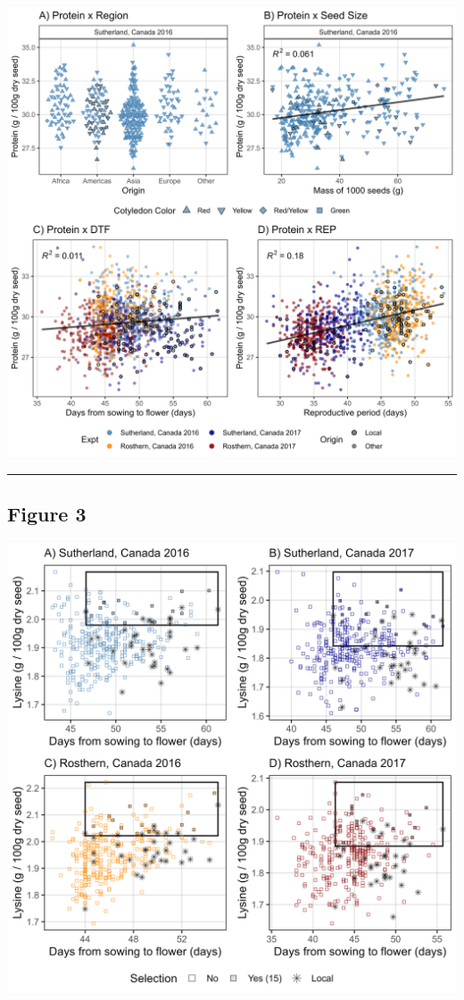 \documentclass[
]{article}
\begin{document}
\includegraphics{Figure_02.jpg}

\begin{center}\rule{0.5\linewidth}{0.5pt}\end{center}

\hypertarget{figure-3}{%
\subsection{Figure 3}\label{figure-3}}

\includegraphics{Figure_03.jpg}
\end{document}
